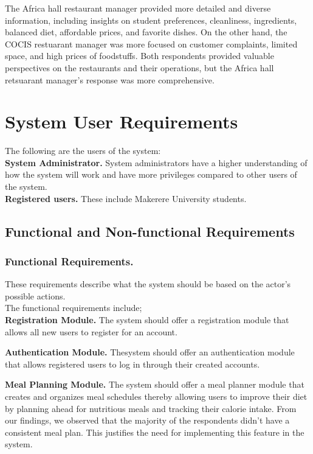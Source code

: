 \documentclass{article}
\begin{document}
\noindent
The Africa hall restaurant manager provided more detailed and diverse information, including insights on student preferences, cleanliness, ingredients, balanced diet, affordable prices, and favorite dishes. On the other hand, the COCIS restuarant manager
was more focused on customer complaints, limited space, and high prices of foodstuffs. Both respondents provided valuable perspectives on the restaurants and their operations, but the Africa hall retsuarant manager's response was more comprehensive.

\newpage
\section{System User Requirements}
The following are the users of the system:\\
\textbf{System Administrator.} System administrators have a higher understanding of how the system will work and have more privileges compared to other users of the system.\\
\textbf{Registered users.} These include Makerere University students.

\subsection{Functional and Non-functional Requirements}
\subsubsection{Functional Requirements.}
These requirements describe what the system should be based on the actor’s possible actions.\\
The functional requirements include;\\
\textbf{Registration Module.} The system should offer a registration module that allows all new users to register for an account.

\noindent
\textbf{Authentication Module.} Thesystem should offer an authentication module that allows registered users to log in through their created accounts.

\noindent
\textbf{Meal Planning Module.} The system should offer a meal planner module that creates and organizes meal schedules thereby allowing users to improve their diet by planning ahead for nutritious meals and tracking their calorie intake. From our findings, we observed that the majority of the respondents didn’t have a consistent meal plan. This justifies the need for implementing this feature in the system.
\end{document}
